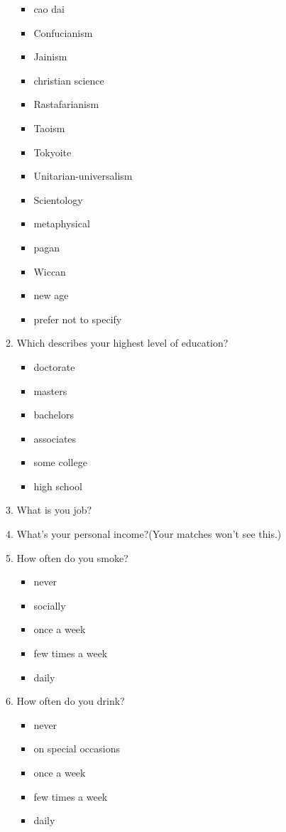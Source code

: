 \begin{appendices}
\begin{itemize}
\begin{enumerate}
\begin{itemize}
				\item cao dai
				\item Confucianism
				\item Jainism
				\item christian science
				\item Rastafarianism
				\item Taoism
				\item Tokyoite
				\item Unitarian-universalism
				\item Scientology
				\item metaphysical
				\item pagan
				\item Wiccan
				\item new age
				\item prefer not to specify 
			\end{itemize}  
			\item Which describes your highest level of education?
			\begin{itemize}
				\item doctorate
				\item masters
				\item bachelors
				\item associates
				\item some college
				\item high school
			\end{itemize} 
			\item What is you job?
			\item What's your personal income?(Your matches won't see this.)
			\item How often do you smoke?
			\begin{itemize}
				\item never
				\item socially
				\item once a week
				\item few times a week
				\item daily
			\end{itemize}
			\item How often do you drink?
				\begin{itemize}
				\item never
				\item on special occasions
				\item once a week
				\item few times a week
				\item daily

\end{itemize}
\end{enumerate}
\end{itemize}
\end{appendices}
